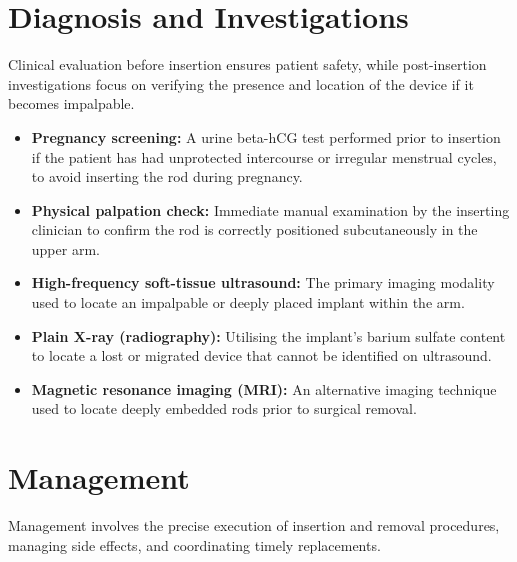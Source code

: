 \section*{Diagnosis and Investigations}
Clinical evaluation before insertion ensures patient safety, while post-insertion investigations focus on verifying the presence and location of the device if it becomes impalpable.

\begin{itemize}
    \item \textbf{Pregnancy screening:} A urine beta-hCG test performed prior to insertion if the patient has had unprotected intercourse or irregular menstrual cycles, to avoid inserting the rod during pregnancy.
    \item \textbf{Physical palpation check:} Immediate manual examination by the inserting clinician to confirm the rod is correctly positioned subcutaneously in the upper arm.
    \item \textbf{High-frequency soft-tissue ultrasound:} The primary imaging modality used to locate an impalpable or deeply placed implant within the arm.
    \item \textbf{Plain X-ray (radiography):} Utilising the implant's barium sulfate content to locate a lost or migrated device that cannot be identified on ultrasound.
    \item \textbf{Magnetic resonance imaging (MRI):} An alternative imaging technique used to locate deeply embedded rods prior to surgical removal.
\end{itemize}

\section*{Management}
Management involves the precise execution of insertion and removal procedures, managing side effects, and coordinating timely replacements.

